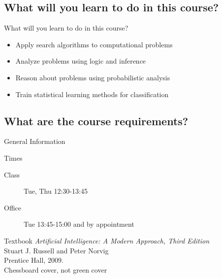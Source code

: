 \documentclass[14pt]{beamer}
\begin{document}
\subsection*{What will you learn to do in this course?}
\begin{frame}{What will you learn to do in this course?}
	\begin{itemize}
		\item Apply search algorithms to computational problems
		\item Analyze problems using logic and inference
		\item Reason about problems using probabilistic analysis
		\item Train statistical learning methods for classification
	\end{itemize}
\end{frame}

\subsection*{What are the course requirements?}

\begin{frame}{General Information}
	\begin{block}{Times}
		\begin{description}
			\item[Class] Tue, Thu 12:30-13:45
			\item[Office] Tue 13:45-15:00 and by appointment
		\end{description}
	\end{block}
	\begin{block}{Textbook}
		\textit{Artificial Intelligence: A Modern Approach, Third Edition}\\		
		Stuart J. Russell and Peter Norvig\\
		Prentice Hall, 2009.\\
		\hfill \alert{Chessboard cover, not green cover}
	\end{block}
\end{frame}
\end{document}
